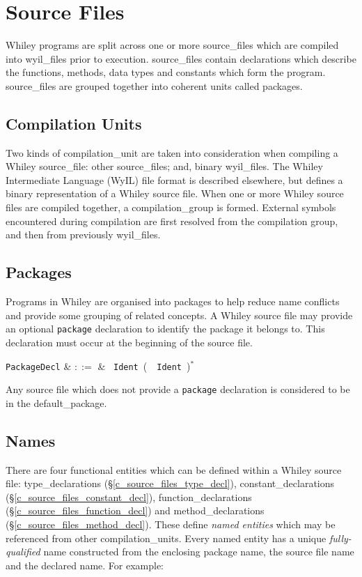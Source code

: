 \chapter{Source Files}
\label{c_source_files}
Whiley programs are split across one or more \gls{source_file}s which
are compiled into \gls{wyil_file}s prior to execution.
\Gls{source_file}s contain declarations which describe the functions,
methods, data types and constants which form the program.
\Gls{source_file}s are grouped together into coherent units called
\gls{package}s.


\section{Compilation Units}
\label{c_source_files_compilation_units}
Two kinds of \gls{compilation_unit} are taken into consideration when compiling a Whiley \gls{source_file}: other \gls{source_file}s; and, binary \gls{wyil_file}s.  The Whiley Intermediate Language (WyIL) file format is described elsewhere, but defines a binary representation of a Whiley source file.  When one or more Whiley source files are compiled together, a \gls{compilation_group} is formed.  External symbols encountered during compilation are first resolved from the compilation group, and then from previously \gls{wyil_file}s.

\section{Packages}
\label{c_source_files_packages}

Programs in Whiley are organised into \gls{package}s to help reduce name conflicts and provide some grouping of related concepts.  A Whiley source file may provide an optional \lstinline{package} declaration to identify the package it belongs to.  This declaration must occur at the beginning of the source file.

\begin{syntax}
\verb+PackageDecl+ & $::=$ & \ \verb+Ident+\ \big(\ \ \verb+Ident+\ \big)$^*$\\
\end{syntax}

Any source file which does not provide a \lstinline{package} declaration is considered to be in the \gls{default_package}.

\section{Names}
\label{c_source_files_names}
There are four functional entities which can be defined within a Whiley source file: \gls{type_declaration}s (\S\ref{c_source_files_type_decl}), \gls{constant_declaration}s (\S\ref{c_source_files_constant_decl}), \gls{function_declaration}s (\S\ref{c_source_files_function_decl}) and \gls{method_declaration}s (\S\ref{c_source_files_method_decl}).  These define {\em named entities} which may be referenced from other \gls{compilation_unit}s.  Every named entity has a unique {\em fully-qualified} name constructed from the enclosing package name, the source file name and the declared name.  For example:\\
\pagebreak

